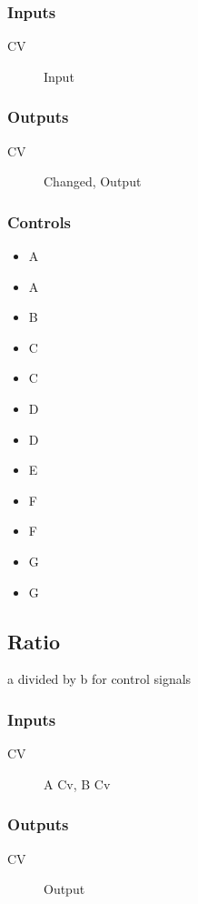 \subsubsection{Inputs}
\begin{description}
\item [CV] Input
\end{description}

\subsubsection{Outputs}
\begin{description}
\item [CV] Changed, Output
\end{description}

\subsubsection{Controls}
\begin{itemize}
\item A
\item A\sharp
\item B
\item C
\item C\sharp
\item D
\item D\sharp
\item E
\item F
\item F\sharp
\item G
\item G\sharp
\end{itemize}

\subsection{Ratio}

a divided by b for control signals



\subsubsection{Inputs}
\begin{description}
\item [CV] A Cv, B Cv
\end{description}

\subsubsection{Outputs}
\begin{description}
\item [CV] Output
\end{description}


